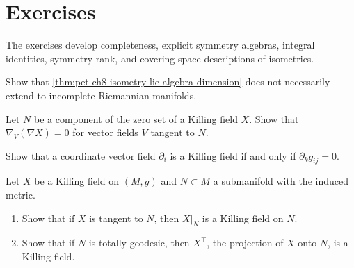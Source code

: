 \section{Exercises}

The exercises develop completeness, explicit symmetry algebras, integral
identities, symmetry rank, and covering-space descriptions of isometries.

\begin{remark}
  \label{rem:pet-ch8-ex-8-4-1}
  Show that \cref{thm:pet-ch8-isometry-lie-algebra-dimension} does not
  necessarily extend to incomplete Riemannian manifolds.
\end{remark}

\begin{remark}
  \label{rem:pet-ch8-ex-8-4-2}
  Let $N$ be a component of the zero set of a Killing field $X$. Show that
  $\nabla_V(\nabla X)=0$ for vector fields $V$ tangent to $N$.
\end{remark}

\begin{remark}
  \label{rem:pet-ch8-ex-8-4-3}
  Show that a coordinate vector field $\partial_i$ is a Killing field if and
  only if $\partial_kg_{ij}=0$.
\end{remark}

\begin{remark}
  \label{rem:pet-ch8-ex-8-4-4}
  Let $X$ be a Killing field on $(M,g)$ and $N\subset M$ a submanifold with the
  induced metric.
  \begin{enumerate}
    \item Show that if $X$ is tangent to $N$, then $X|_N$ is a Killing field
      on $N$.
    \item Show that if $N$ is totally geodesic, then $X^\top$, the projection
      of $X$ onto $N$, is a Killing field.
  \end{enumerate}
\end{remark}

